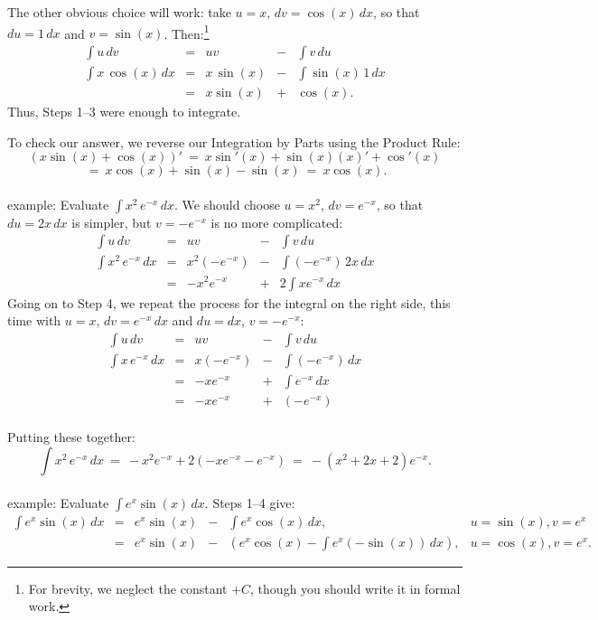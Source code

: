 \documentclass[11pt]{article}
\begin{document}
The other obvious choice will work: take $u=x$, $dv = \cos(x)\,dx$, so that $du = 1\, dx$ and $v=\sin(x)$. Then:\footnote{
For brevity, we neglect the constant $+C$, 
though you should write it in formal work.
}
$$\begin{array}{ccccc}
\int u\,dv & = & uv & - & \int v\,du 
\\[.5em]
\int x\,\cos(x)\,dx & = & x\,\sin(x) & - & \int \sin(x)\,1\,dx
\\[.5em]
& = & x\sin(x) & + & \cos(x) .
\end{array}$$
Thus, Steps 1--3 were enough to integrate.

To check our answer, we reverse our Integration by Parts using the Product Rule:
$$
(x\sin(x) + \cos(x))' 
\ =\ 
x\sin'(x) + \sin(x)(x)' + \cos'(x)
$$
$$
\ =\
x\cos(x) + \sin(x) - \sin(x) \ =\ x\cos(x).
$$
\\[.5em]
{\sc example:} Evaluate  $\int x^2\,e^{-x}\,dx$. We should choose $u=x^2$, $dv=e^{-x}$, so that $du=2x\,dx$ is simpler, but $v = -e^{-x}$ is no more complicated:
$$\begin{array}{ccccc}
\int u\,dv & = & uv & - & \int v\,du 
\\[.5em]
\int x^2\,e^{-x}\,dx & = & x^2(-e^{-x}) & - & \int (-e^{-x})\,2x\,dx
\\[.5em]
&=& -x^2e^{-x}&+ &2\int\! x e^{-x}\,dx
\end{array}$$
Going on to Step 4, we repeat the process for the integral on the right side,
this time with $u = x$, $dv= e^{-x}\,dx$ and
$du = dx$, $v = -e^{-x}$:
$$\begin{array}{ccccc}
\int u\,dv & = & uv & - & \int v\,du 
\\[.5em]
\int x\,e^{-x}\,dx & = & x(-e^{-x}) & - & \int (-e^{-x})\,dx
\\[.5em]
&=& -xe^{-x}&+ &\int\! e^{-x}\,dx
\\[.5em]
&=& -xe^{-x}&+ &(-e^{-x})
\end{array}$$
\\[-1.5em]
Putting these together:
$$
\int x^2\,e^{-x}\,dx
\ =\
-x^2e^{-x}+ 2(-xe^{-x}-e^{-x})
\ =\ -(x^2+2x+2)e^{-x}.
$$
\\[-.2em]
\noindent
{\sc example:} Evaluate $\int e^x\sin(x)\,dx$.
Steps 1--4 give:
$$\begin{array}{cccccc}
\int e^x\sin(x)\,dx & = & e^x\sin(x) & - & \int e^x\cos(x)\,dx,
& u = \sin(x), v = e^x
\\[.5em]
& = & e^x\sin(x) & - & \left(e^x\cos(x) -
\int e^x(-\sin(x))\,dx\right),
& u = \cos(x), v = e^x.
\end{array}$$
\end{document}
